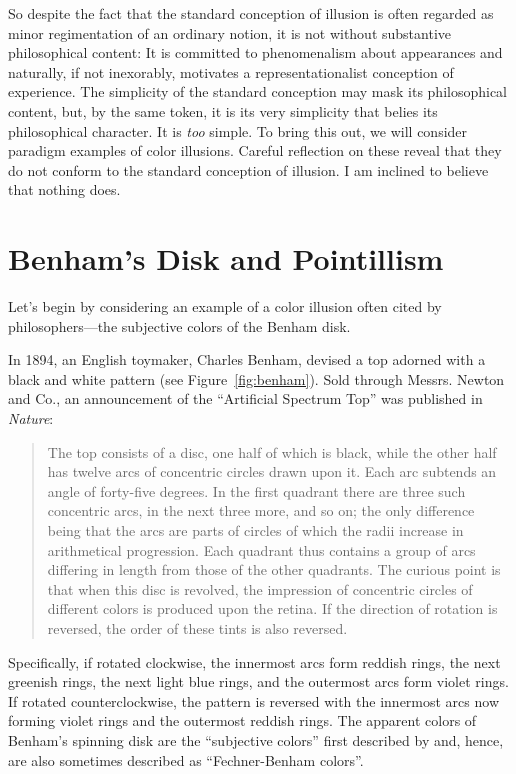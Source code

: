 \documentclass[12pt]{article}
\begin{document}
So despite the fact that the standard conception of illusion is often regarded as minor regimentation of an ordinary notion, it is not without substantive philosophical content: It is committed to phenomenalism about appearances and naturally, if not inexorably, motivates a representationalist conception of experience. The simplicity of the standard conception may mask its philosophical content, but, by the same token, it is its very simplicity that belies its philosophical character. It is \emph{too} simple. To bring this out, we will consider paradigm examples of color illusions. Careful reflection on these reveal that they do not conform to the standard conception of illusion. I am inclined to believe that nothing does.


\section{Benham's Disk and Pointillism} %
\label{sec:benham_s_disk}

Let's begin by considering an example of a color illusion often cited by philosophers---the subjective colors of the Benham disk.

In 1894, an English toymaker, Charles Benham, devised a top adorned with a black and white pattern (see Figure~\ref{fig:benham}). Sold through Messrs. Newton and Co., an announcement of the ``Artificial Spectrum Top'' was published in \emph{Nature}:
	\begin{quote}
		The top consists of a disc, one half of which is black, while the other half has twelve arcs of concentric circles drawn upon it. Each arc subtends an angle of forty-five degrees. In the first quadrant there are three such concentric arcs, in the next three more, and so on; the only difference being that the arcs are parts of circles of which the radii increase in arithmetical progression. Each quadrant thus contains a group of arcs differing in length from those of the other quadrants. The curious point is that when this disc is revolved, the impression of concentric circles of different colors is produced upon the retina. If the direction of rotation is reversed, the order of these tints is also reversed. \citep{Benham:1894kx}
	\end{quote}
Specifically, if rotated clockwise, the innermost arcs form reddish rings, the next greenish rings, the next light blue rings, and the outermost arcs form violet rings. If rotated counterclockwise, the pattern is reversed with the innermost arcs now forming violet rings and the outermost reddish rings. The apparent colors of Benham's spinning disk are the ``subjective colors'' first described by \citep{Fechner:1838vn} and, hence, are also sometimes described as ``Fechner-Benham colors''. 
\end{document}

